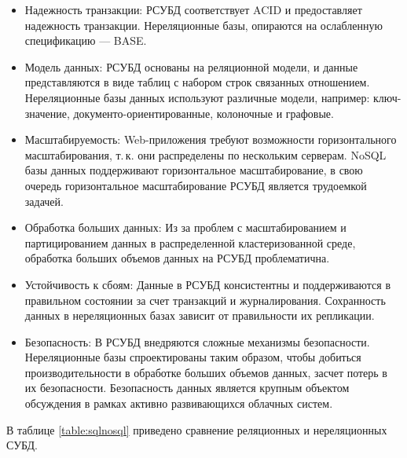 \begin{itemize}[label=---]
    \item Надежность транзакции: РСУБД соответствует ACID и предоставляет надежность транзакции.
    Нереляционные базы, опираются на ослабленную спецификацию --- BASE.
    \item Модель данных: РСУБД основаны на реляционной модели, и данные представляются в виде таблиц с набором строк связанных отношением.
    Нереляционные базы данных используют различные модели, например: ключ-значение, документо-ориентированные, колоночные и графовые.
    \item Масштабируемость: Web-приложения требуют возможности горизонтального масштабирования, т.\,к. они распределены по нескольким серверам.
    NoSQL базы данных поддерживают горизонтальное масштабирование, в свою очередь горизонтальное масштабирование РСУБД является трудоемкой задачей.
    \item Обработка больших данных: Из за проблем с масштабированием и партицированием данных в распределенной кластеризованной среде, обработка больших объемов данных на РСУБД проблематична.
    \item Устойчивость к сбоям: Данные в РСУБД консистентны и поддерживаются в правильном состоянии за счет транзакций и журналирования.
    Сохранность данных в нереляционных базах зависит от правильности их репликации.
    \item Безопасность: В РСУБД внедряются сложные механизмы безопасности.
    Нереляционные базы спроектированы таким образом, чтобы добиться производительности в обработке больших объемов данных, засчет потерь в их безопасности.
    Безопасность данных является крупным объектом обсуждения в рамках активно развивающихся облачных систем.
\end{itemize}

\clearpage

В таблице \ref{table:sqlnosql} приведено сравнение реляционных и нереляционных СУБД.

